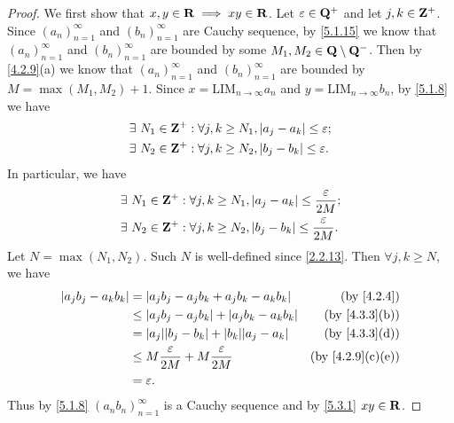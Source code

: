 \begin{proof}
  We first show that \(x, y \in \mathbf{R} \implies xy \in \mathbf{R}\).
  Let \(\varepsilon \in \mathbf{Q}^+\) and let \(j, k \in \mathbf{Z}^+\).
  Since \((a_n)_{n = 1}^\infty\) and \((b_n)_{n = 1}^\infty\) are Cauchy sequence, by \cref{5.1.15} we know that \((a_n)_{n = 1}^\infty\) and \((b_n)_{n = 1}^\infty\) are bounded by some \(M_1, M_2 \in \mathbf{Q} \setminus \mathbf{Q}^-\).
  Then by \cref{4.2.9}(a) we know that \((a_n)_{n = 1}^\infty\) and \((b_n)_{n = 1}^\infty\) are bounded by \(M = \max(M_1, M_2) + 1\).
  Since \(x = \text{LIM}_{n \to \infty} a_n\) and \(y = \text{LIM}_{n \to \infty} b_n\), by \cref{5.1.8} we have
  \begin{align*}
     & \exists\ N_1 \in \mathbf{Z}^+ : \forall j, k \geq N_1, \left\lvert a_j - a_k\right\rvert \leq \varepsilon; \\
     & \exists\ N_2 \in \mathbf{Z}^+ : \forall j, k \geq N_2, \left\lvert b_j - b_k\right\rvert \leq \varepsilon.
  \end{align*}
  In particular, we have
  \begin{align*}
     & \exists\ N_1 \in \mathbf{Z}^+ : \forall j, k \geq N_1, \left\lvert a_j - a_k\right\rvert \leq \frac{\varepsilon}{2M}; \\
     & \exists\ N_2 \in \mathbf{Z}^+ : \forall j, k \geq N_2, \left\lvert b_j - b_k\right\rvert \leq \frac{\varepsilon}{2M}.
  \end{align*}
  Let \(N = \max(N_1, N_2)\).
  Such \(N\) is well-defined since \cref{2.2.13}.
  Then \(\forall j, k \geq N\), we have
  \begin{align*}
    \abs{a_j b_j - a_k b_k} & = \abs{a_j b_j - a_j b_k + a_j b_k - a_k b_k}            & \text{(by \cref{4.2.4})}       \\
                            & \leq \abs{a_j b_j - a_j b_k} + \abs{a_j b_k - a_k b_k}   & \text{(by \cref{4.3.3}(b))}    \\
                            & = \abs{a_j} \abs{b_j - b_k} + \abs{b_k} \abs{a_j - a_k}  & \text{(by \cref{4.3.3}(d))}    \\
                            & \leq M \frac{\varepsilon}{2M} + M \frac{\varepsilon}{2M} & \text{(by \cref{4.2.9}(c)(e))} \\
                            & = \varepsilon.
  \end{align*}
  Thus by \cref{5.1.8} \((a_n b_n)_{n = 1}^\infty\) is a Cauchy sequence and by \cref{5.3.1} \(xy \in \mathbf{R}\).


\end{proof}
